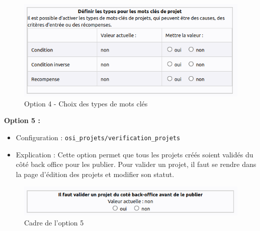 \vspace{0.5cm}
\begin{figure}[h]
    \centering
    \includegraphics[trim=0 0 0 0, clip, width=1\textwidth]{./images/c4.png}
    \caption{Option 4 - Choix des types de mots clés}
    \label{option4}
\end{figure}
\vspace{0.5cm}




\textbf{Option 5 :} 
\begin{itemize}
    \item Configuration : \texttt{osi\_projets/verification\_projets}
    \item Explication : Cette option permet que tous les projets créés soient validés du côté back office pour les publier. Pour valider un projet, il faut se rendre dans la page d'édition des projets et modifier son statut.
\end{itemize}
\vspace{0.5cm}
\begin{figure}[h]
    \centering
    \includegraphics[trim=0 0 0 0, clip, width=1\textwidth]{./images/c5.png}
    \caption{Cadre de l'option 5}
    \label{option5}
\end{figure}
\vspace{0.5cm}

\newpage


